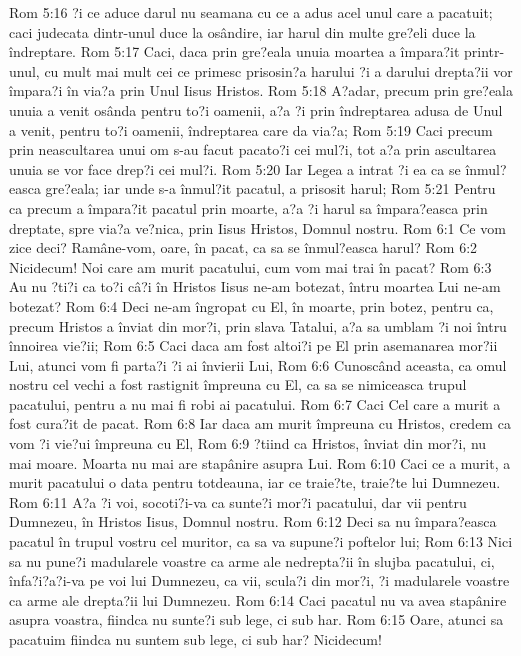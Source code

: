 Rom 5:16  ?i ce aduce darul nu seamana cu ce a adus acel unul care a pacatuit; caci judecata dintr-unul duce la osândire, iar harul din multe gre?eli duce la îndreptare.
Rom 5:17  Caci, daca prin gre?eala unuia moartea a împara?it printr-unul, cu mult mai mult cei ce primesc prisosin?a harului ?i a darului drepta?ii vor împara?i în via?a prin Unul Iisus Hristos.
Rom 5:18  A?adar, precum prin gre?eala unuia a venit osânda pentru to?i oamenii, a?a ?i prin îndreptarea adusa de Unul a venit, pentru to?i oamenii, îndreptarea care da via?a;
Rom 5:19  Caci precum prin neascultarea unui om s-au facut pacato?i cei mul?i, tot a?a prin ascultarea unuia se vor face drep?i cei mul?i.
Rom 5:20  Iar Legea a intrat ?i ea ca se înmul?easca gre?eala; iar unde s-a înmul?it pacatul, a prisosit harul;
Rom 5:21  Pentru ca precum a împara?it pacatul prin moarte, a?a ?i harul sa împara?easca prin dreptate, spre via?a ve?nica, prin Iisus Hristos, Domnul nostru.
Rom 6:1  Ce vom zice deci? Ramâne-vom, oare, în pacat, ca sa se înmul?easca harul?
Rom 6:2  Nicidecum! Noi care am murit pacatului, cum vom mai trai în pacat?
Rom 6:3  Au nu ?ti?i ca to?i câ?i în Hristos Iisus ne-am botezat, întru moartea Lui ne-am botezat?
Rom 6:4  Deci ne-am îngropat cu El, în moarte, prin botez, pentru ca, precum Hristos a înviat din mor?i, prin slava Tatalui, a?a sa umblam ?i noi întru înnoirea vie?ii;
Rom 6:5  Caci daca am fost altoi?i pe El prin asemanarea mor?ii Lui, atunci vom fi parta?i ?i ai învierii Lui,
Rom 6:6  Cunoscând aceasta, ca omul nostru cel vechi a fost rastignit împreuna cu El, ca sa se nimiceasca trupul pacatului, pentru a nu mai fi robi ai pacatului.
Rom 6:7  Caci Cel care a murit a fost cura?it de pacat.
Rom 6:8  Iar daca am murit împreuna cu Hristos, credem ca vom ?i vie?ui împreuna cu El,
Rom 6:9  ?tiind ca Hristos, înviat din mor?i, nu mai moare. Moarta nu mai are stapânire asupra Lui.
Rom 6:10  Caci ce a murit, a murit pacatului o data pentru totdeauna, iar ce traie?te, traie?te lui Dumnezeu.
Rom 6:11  A?a ?i voi, socoti?i-va ca sunte?i mor?i pacatului, dar vii pentru Dumnezeu, în Hristos Iisus, Domnul nostru.
Rom 6:12  Deci sa nu împara?easca pacatul în trupul vostru cel muritor, ca sa va supune?i poftelor lui;
Rom 6:13  Nici sa nu pune?i madularele voastre ca arme ale nedrepta?ii în slujba pacatului, ci, înfa?i?a?i-va pe voi lui Dumnezeu, ca vii, scula?i din mor?i, ?i madularele voastre ca arme ale drepta?ii lui Dumnezeu.
Rom 6:14  Caci pacatul nu va avea stapânire asupra voastra, fiindca nu sunte?i sub lege, ci sub har.
Rom 6:15  Oare, atunci sa pacatuim fiindca nu suntem sub lege, ci sub har? Nicidecum!
